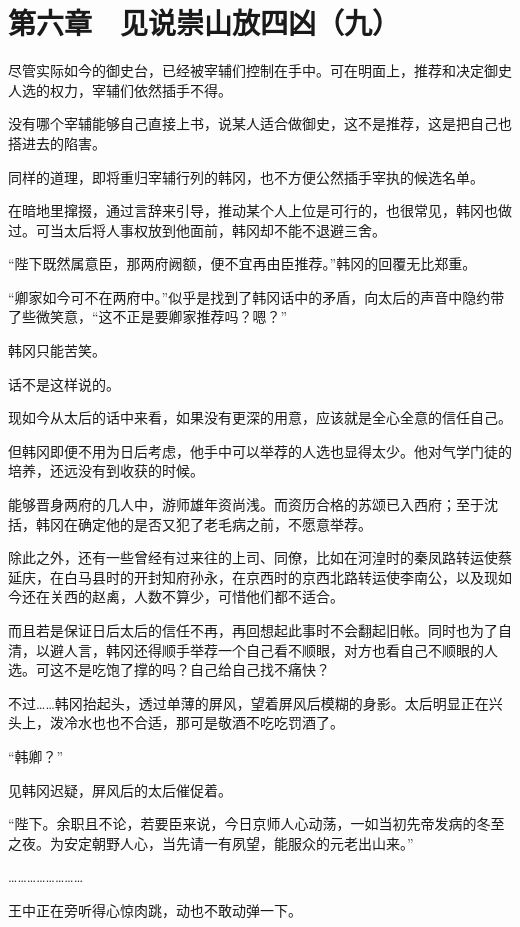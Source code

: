 \section{第六章　见说崇山放四凶（九）}

尽管实际如今的御史台，已经被宰辅们控制在手中。可在明面上，推荐和决定御史人选的权力，宰辅们依然插手不得。

没有哪个宰辅能够自己直接上书，说某人适合做御史，这不是推荐，这是把自己也搭进去的陷害。

同样的道理，即将重归宰辅行列的韩冈，也不方便公然插手宰执的候选名单。

在暗地里撺掇，通过言辞来引导，推动某个人上位是可行的，也很常见，韩冈也做过。可当太后将人事权放到他面前，韩冈却不能不退避三舍。

“陛下既然属意臣，那两府阙额，便不宜再由臣推荐。”韩冈的回覆无比郑重。

“卿家如今可不在两府中。”似乎是找到了韩冈话中的矛盾，向太后的声音中隐约带了些微笑意，“这不正是要卿家推荐吗？嗯？”

韩冈只能苦笑。

话不是这样说的。

现如今从太后的话中来看，如果没有更深的用意，应该就是全心全意的信任自己。

但韩冈即便不用为日后考虑，他手中可以举荐的人选也显得太少。他对气学门徒的培养，还远没有到收获的时候。

能够晋身两府的几人中，游师雄年资尚浅。而资历合格的苏颂已入西府；至于沈括，韩冈在确定他的是否又犯了老毛病之前，不愿意举荐。

除此之外，还有一些曾经有过来往的上司、同僚，比如在河湟时的秦凤路转运使蔡延庆，在白马县时的开封知府孙永，在京西时的京西北路转运使李南公，以及现如今还在关西的赵禼，人数不算少，可惜他们都不适合。

而且若是保证日后太后的信任不再，再回想起此事时不会翻起旧帐。同时也为了自清，以避人言，韩冈还得顺手举荐一个自己看不顺眼，对方也看自己不顺眼的人选。可这不是吃饱了撑的吗？自己给自己找不痛快？

不过……韩冈抬起头，透过单薄的屏风，望着屏风后模糊的身影。太后明显正在兴头上，泼冷水也也不合适，那可是敬酒不吃吃罚酒了。

“韩卿？”

见韩冈迟疑，屏风后的太后催促着。

“陛下。余职且不论，若要臣来说，今日京师人心动荡，一如当初先帝发病的冬至之夜。为安定朝野人心，当先请一有夙望，能服众的元老出山来。”

……………………

王中正在旁听得心惊肉跳，动也不敢动弹一下。

